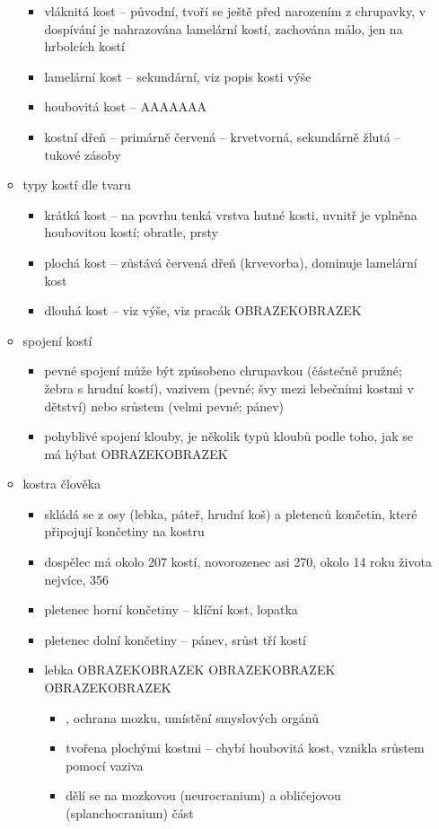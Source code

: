 \documentclass{article}
\begin{document}
\begin{itemize}
\begin{itemize}
\begin{itemize}
      \item vláknitá kost -- původní, tvoří se ještě před narozením z chrupavky, v dospívání je nahrazována lamelární kostí, zachována málo, jen na hrbolcích kostí
      \item lamelární kost -- sekundární, viz popis kosti výše
      \item houbovitá kost -- AAAAAAA
      \item kostní dřeň -- primárně červená -- krvetvorná, sekundárně žlutá -- tukové zásoby
    \end{itemize}
    \item typy kostí dle tvaru
    \begin{itemize}
      \item krátká kost -- na povrhu tenká vrstva hutné kosti, uvnitř je vplněna houbovitou kostí; obratle, prsty
      \item plochá kost -- zůstává červená dřeň (krvevorba), dominuje lamelární kost
      \item dlouhá kost -- viz výše, viz pracák OBRAZEKOBRAZEK
    \end{itemize}
    \item spojení kostí
    \begin{itemize}
      \item pevné spojení může být způsobeno chrupavkou (částečně pružné; žebra s hrudní kostí), vazivem (pevné; švy mezi lebečními kostmi v dětství) nebo srůstem (velmi pevné; pánev)
      \item pohyblivé spojení klouby, je několik typů kloubů podle toho, jak se má hýbat OBRAZEKOBRAZEK
    \end{itemize}
    \item kostra člověka
    \begin{itemize}
      \item skládá se z osy (lebka, páteř, hrudní koš) a pletenců končetin, které připojují končetiny na kostru
      \item dospělec má okolo 207 kostí, novorozenec asi 270, okolo 14 roku života nejvíce, 356
      \item pletenec horní končetiny -- klíční kost, lopatka
      \item pletenec dolní končetiny -- pánev, srůst tří kostí
      \item lebka OBRAZEKOBRAZEK OBRAZEKOBRAZEK OBRAZEKOBRAZEK
      \begin{itemize}
        \item {}, ochrana mozku, umístění smyslových orgánů
        \item tvořena plochými kostmi -- chybí houbovitá kost, vznikla srůstem pomocí vaziva
        \item dělí se na mozkovou (neurocranium) a obličejovou (splanchocranium) část
      \end{itemize}
    \end{itemize}
  \end{itemize}
\end{itemize}
\end{document}
